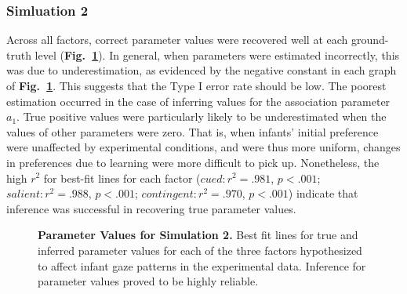 \documentclass[12pt]{article}
\begin{document}
\subsubsection*{Simluation 2}

	Across all factors, correct parameter values were recovered well at each ground-truth level (\textbf{Fig.~\ref{fig:sim2}}). In general, when parameters were estimated incorrectly, this was due to underestimation, as evidenced by the negative constant in each graph of \textbf{Fig.~\ref{fig:sim2}}. This suggests that the Type I error rate should be low. The poorest estimation occurred in the case of inferring values for the association parameter $a_{1}$. True positive values were particularly likely to be underestimated when the values of other parameters were zero. That is, when infants' initial preference were unaffected by experimental conditions, and were thus more uniform, changes in preferences due to learning were more difficult to pick up. Nonetheless, the high $r^{2}$ for best-fit lines for each factor ($cued: r^{2}  = .981$, $p < .001$; $salient: r^{2}  = .988$, $p < .001$; $contingent: r^{2} = .970$, $p < .001$) indicate that inference was successful in recovering true parameter values.

\begin{figure}[!h]
\caption{\textbf{Parameter Values for Simulation 2.} Best fit lines for true and inferred parameter values for each of the three factors hypothesized to affect infant gaze patterns in the experimental data. Inference for parameter values proved to be highly reliable.}
\label{fig:sim2}
\end{figure}
\end{document}
